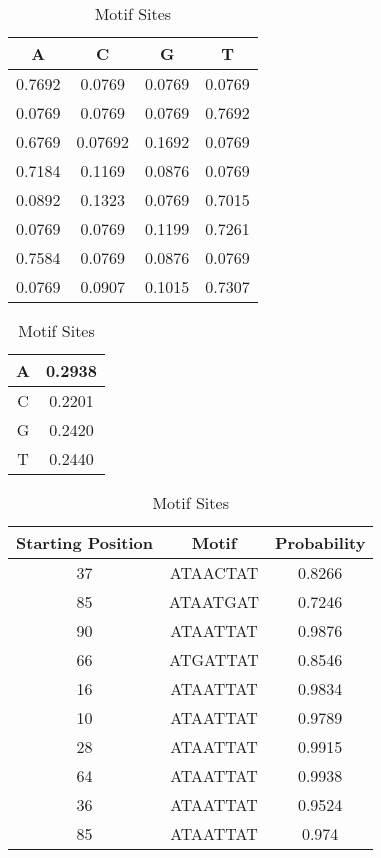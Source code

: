 \documentclass{acm_proc_article-sp}
\begin{document}
\begin{table}
\centering
\caption{Motif Model}
\label{posmat}
\begin{tabular}{|c|c|c|c|} \hline
 A & C & G & T\\ \hline
0.7692&0.0769&0.0769 &0.0769 \\ \hline
0.0769& 0.0769 & 0.0769 &0.7692 \\ \hline
0.6769& 0.07692&0.1692 &0.0769 \\ \hline
0.7184& 0.1169&0.0876 & 0.0769 \\ \hline
0.0892& 0.1323& 0.0769 & 0.7015 \\ \hline
0.0769& 0.0769&0.1199&0.7261 \\ \hline
0.7584&0.0769& 0.0876& 0.0769 \\ \hline
0.0769&0.0907 &  0.1015 &0.7307 \\ 
\hline\end{tabular}

\vspace{1.8em}
\caption{Background Model}
\begin{tabular}{|c|c|} \hline
A & 0.2938 \\ \hline
C &0.2201 \\ \hline
G& 0.2420 \\ \hline
T& 0.2440 \\
\hline\end{tabular}
\vspace{1.8em}

\caption{Motif Sites}
\label{posmat}
\begin{tabular}{|c|c|c|} \hline
Starting Position& Motif & Probability \\ \hline
37 &ATAACTAT & 0.8266 \\ \hline
85 &ATAATGAT &0.7246 \\ \hline
90 &ATAATTAT &0.9876 \\ \hline
66 &ATGATTAT &0.8546 \\ \hline
16 &ATAATTAT &0.9834 \\ \hline
10 &ATAATTAT &0.9789 \\ \hline
28 &ATAATTAT &0.9915 \\ \hline
64 &ATAATTAT &0.9938 \\ \hline
36 &ATAATTAT &0.9524 \\ \hline
85 &ATAATTAT &0.974 \\ 
\hline\end{tabular}



\end{table}
\end{document}
